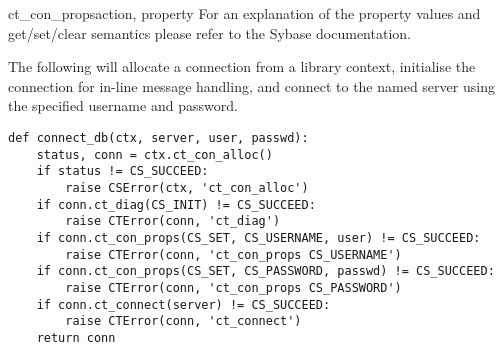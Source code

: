 \begin{methoddesc}[CS_CONNECTION]{ct_con_props}{action, property }
For an explanation of the property values and get/set/clear semantics
please refer to the Sybase documentation.

The following will allocate a connection from a library context,
initialise the connection for in-line message handling, and connect to
the named server using the specified username and password.

\begin{verbatim}
def connect_db(ctx, server, user, passwd):
    status, conn = ctx.ct_con_alloc()
    if status != CS_SUCCEED:
        raise CSError(ctx, 'ct_con_alloc')
    if conn.ct_diag(CS_INIT) != CS_SUCCEED:
        raise CTError(conn, 'ct_diag')
    if conn.ct_con_props(CS_SET, CS_USERNAME, user) != CS_SUCCEED:
        raise CTError(conn, 'ct_con_props CS_USERNAME')
    if conn.ct_con_props(CS_SET, CS_PASSWORD, passwd) != CS_SUCCEED:
        raise CTError(conn, 'ct_con_props CS_PASSWORD')
    if conn.ct_connect(server) != CS_SUCCEED:
        raise CTError(conn, 'ct_connect')
    return conn
\end{verbatim}
\end{methoddesc}

